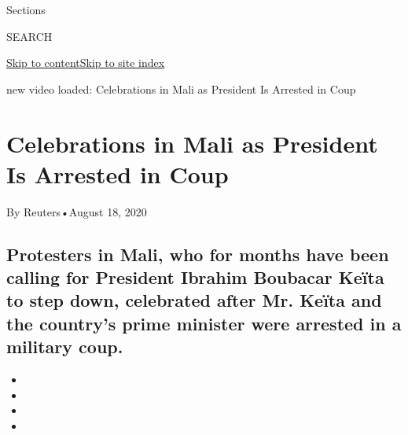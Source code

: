 Sections

SEARCH

\protect\hyperlink{site-content}{Skip to
content}\protect\hyperlink{site-index}{Skip to site index}

new video loaded: Celebrations in Mali as President Is Arrested in Coup

\hypertarget{celebrations-in-mali-as-president-is-arrested-in-coup}{%
\section{Celebrations in Mali as President Is Arrested in
Coup}\label{celebrations-in-mali-as-president-is-arrested-in-coup}}

By Reuters•August 18, 2020

\hypertarget{protesters-in-mali-who-for-months-have-been-calling-for-president-ibrahim-boubacar-keuxefta-to-step-down-celebrated-after-mr-keuxefta-and-the-countrys-prime-minister-were-arrested-in-a-military-coup}{%
\subsection{Protesters in Mali, who for months have been calling for
President Ibrahim Boubacar Keïta to step down, celebrated after Mr.
Keïta and the country's prime minister​ were arrested in a military
coup​.}\label{protesters-in-mali-who-for-months-have-been-calling-for-president-ibrahim-boubacar-keuxefta-to-step-down-celebrated-after-mr-keuxefta-and-the-countrys-prime-minister-were-arrested-in-a-military-coup}}

\begin{itemize}
\item
\item
\item
\item
\end{itemize}

